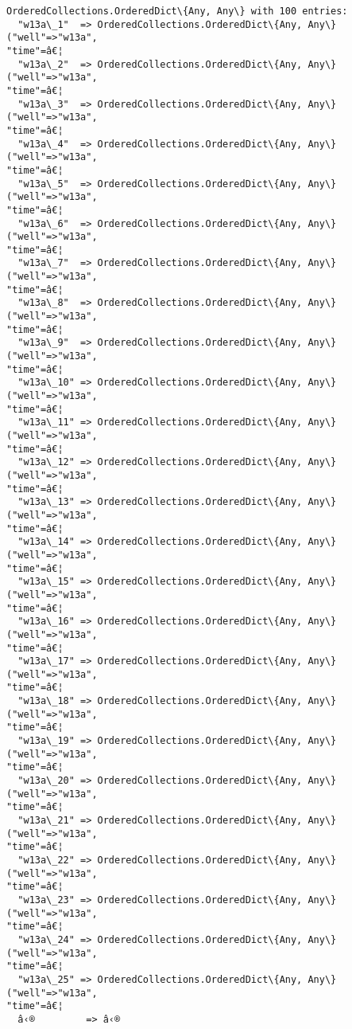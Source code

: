 \documentclass[11pt]{article}
\makeatletter
\newcommand{\boxspacing}{\kern\kvtcb@left@rule\kern\kvtcb@boxsep}
\newcommand{\prompt}[4]{
        {\ttfamily\llap{{\color{#2}[#3]:\hspace{3pt}#4}}\vspace{-\baselineskip}}
    }
\makeatother
\begin{document}
            \begin{tcolorbox}[breakable, size=fbox, boxrule=.5pt, pad at break*=1mm, opacityfill=0]
\prompt{Out}{outcolor}{4}{\boxspacing}
\begin{Verbatim}[commandchars=\\\{\}]
OrderedCollections.OrderedDict\{Any, Any\} with 100 entries:
  "w13a\_1"  => OrderedCollections.OrderedDict\{Any, Any\}("well"=>"w13a",
"time"=â€¦
  "w13a\_2"  => OrderedCollections.OrderedDict\{Any, Any\}("well"=>"w13a",
"time"=â€¦
  "w13a\_3"  => OrderedCollections.OrderedDict\{Any, Any\}("well"=>"w13a",
"time"=â€¦
  "w13a\_4"  => OrderedCollections.OrderedDict\{Any, Any\}("well"=>"w13a",
"time"=â€¦
  "w13a\_5"  => OrderedCollections.OrderedDict\{Any, Any\}("well"=>"w13a",
"time"=â€¦
  "w13a\_6"  => OrderedCollections.OrderedDict\{Any, Any\}("well"=>"w13a",
"time"=â€¦
  "w13a\_7"  => OrderedCollections.OrderedDict\{Any, Any\}("well"=>"w13a",
"time"=â€¦
  "w13a\_8"  => OrderedCollections.OrderedDict\{Any, Any\}("well"=>"w13a",
"time"=â€¦
  "w13a\_9"  => OrderedCollections.OrderedDict\{Any, Any\}("well"=>"w13a",
"time"=â€¦
  "w13a\_10" => OrderedCollections.OrderedDict\{Any, Any\}("well"=>"w13a",
"time"=â€¦
  "w13a\_11" => OrderedCollections.OrderedDict\{Any, Any\}("well"=>"w13a",
"time"=â€¦
  "w13a\_12" => OrderedCollections.OrderedDict\{Any, Any\}("well"=>"w13a",
"time"=â€¦
  "w13a\_13" => OrderedCollections.OrderedDict\{Any, Any\}("well"=>"w13a",
"time"=â€¦
  "w13a\_14" => OrderedCollections.OrderedDict\{Any, Any\}("well"=>"w13a",
"time"=â€¦
  "w13a\_15" => OrderedCollections.OrderedDict\{Any, Any\}("well"=>"w13a",
"time"=â€¦
  "w13a\_16" => OrderedCollections.OrderedDict\{Any, Any\}("well"=>"w13a",
"time"=â€¦
  "w13a\_17" => OrderedCollections.OrderedDict\{Any, Any\}("well"=>"w13a",
"time"=â€¦
  "w13a\_18" => OrderedCollections.OrderedDict\{Any, Any\}("well"=>"w13a",
"time"=â€¦
  "w13a\_19" => OrderedCollections.OrderedDict\{Any, Any\}("well"=>"w13a",
"time"=â€¦
  "w13a\_20" => OrderedCollections.OrderedDict\{Any, Any\}("well"=>"w13a",
"time"=â€¦
  "w13a\_21" => OrderedCollections.OrderedDict\{Any, Any\}("well"=>"w13a",
"time"=â€¦
  "w13a\_22" => OrderedCollections.OrderedDict\{Any, Any\}("well"=>"w13a",
"time"=â€¦
  "w13a\_23" => OrderedCollections.OrderedDict\{Any, Any\}("well"=>"w13a",
"time"=â€¦
  "w13a\_24" => OrderedCollections.OrderedDict\{Any, Any\}("well"=>"w13a",
"time"=â€¦
  "w13a\_25" => OrderedCollections.OrderedDict\{Any, Any\}("well"=>"w13a",
"time"=â€¦
  â‹®         => â‹®
\end{Verbatim}
\end{tcolorbox}
        
\end{document}
